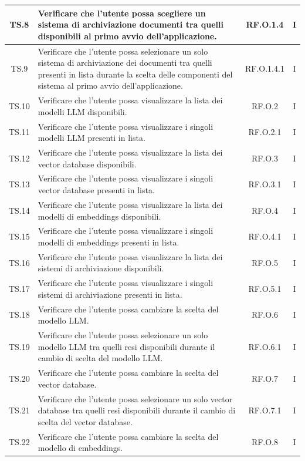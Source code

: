 \begin{xltabular}{\textwidth}{|c|X|c|c|}
\hline
TS.8 & Verificare che l'utente possa scegliere un sistema di archiviazione documenti tra quelli disponibili al primo avvio dell'applicazione. & RF.O.1.4 & I \\
\hline
TS.9 & Verificare che l'utente possa selezionare un solo sistema di archiviazione dei documenti tra quelli presenti in lista durante la scelta delle componenti del sistema al primo avvio dell'applicazione. & RF.O.1.4.1 & I \\
\hline
TS.10 & Verificare che l'utente possa visualizzare la lista dei modelli LLM disponibili. & RF.O.2 & I \\
\hline
TS.11 & Verificare che l'utente possa visualizzare i singoli modelli LLM presenti in lista. & RF.O.2.1 & I \\
\hline
TS.12 & Verificare che l'utente possa visualizzare la lista dei vector database disponibili. & RF.O.3 & I \\
\hline
TS.13 & Verificare che l'utente possa visualizzare i singoli vector database presenti in lista. & RF.O.3.1 & I \\
\hline
TS.14 & Verificare che l'utente possa visualizzare la lista dei modelli di embeddings disponibili. & RF.O.4 & I \\
\hline
TS.15 & Verificare che l'utente possa visualizzare i singoli modelli di embeddings presenti in lista. & RF.O.4.1 & I \\
\hline
TS.16 & Verificare che l'utente possa visualizzare la lista dei sistemi di archiviazione disponibili. & RF.O.5 & I \\
\hline
TS.17 & Verificare che l'utente possa visualizzare i singoli sistemi di archiviazione presenti in lista. & RF.O.5.1 & I \\
\hline
TS.18 & Verificare che l'utente possa cambiare la scelta del modello LLM. & RF.O.6 & I \\
\hline
TS.19 & Verificare che l'utente possa selezionare un solo modello LLM tra quelli resi disponibili durante il cambio di scelta del modello LLM. & RF.O.6.1 & I \\
\hline
TS.20 & Verificare che l'utente possa cambiare la scelta del vector database. & RF.O.7 & I \\
\hline
TS.21 & Verificare che l'utente possa selezionare un solo vector database tra quelli resi disponibili durante il cambio di scelta del vector database. & RF.O.7.1 & I \\
\hline
TS.22 & Verificare che l'utente possa cambiare la scelta del modello di embeddings. & RF.O.8 & I \\

\end{xltabular}
